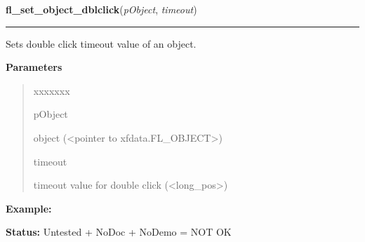     \vspace{0.5ex}

\hspace{.8\funcindent}\begin{boxedminipage}{\funcwidth}

    \raggedright \textbf{fl\_set\_object\_dblclick}(\textit{pObject}, \textit{timeout})

    \vspace{-1.5ex}

    \rule{\textwidth}{0.5\fboxrule}
\setlength{\parskip}{2ex}
    Sets double click timeout value of an object.

\setlength{\parskip}{1ex}
      \textbf{Parameters}
      \vspace{-1ex}

      \begin{quote}
        \begin{Ventry}{xxxxxxx}

          \item[pObject]

          object ({\textless}pointer to xfdata.FL\_OBJECT{\textgreater})

          \item[timeout]

          timeout value for double click 
          ({\textless}long\_pos{\textgreater})

        \end{Ventry}

      \end{quote}

\textbf{Example:} 

\textbf{Status:} Untested + NoDoc + NoDemo = NOT OK



    \end{boxedminipage}

    \label{xformslib:library:fl_get_object_dblclick}

    \vspace{0.5ex}

